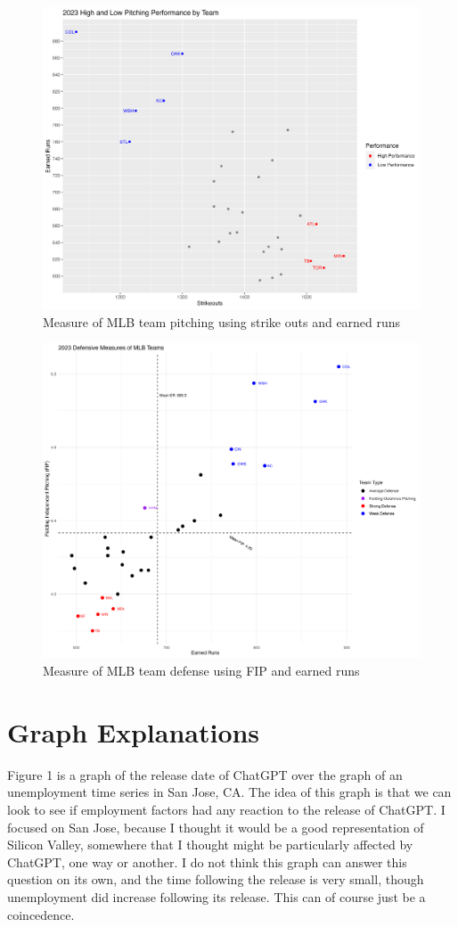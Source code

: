 \documentclass{article}
\begin{document}
\begin{figure}
    \centering
    \includegraphics[width=0.8\linewidth]{PS6b_Spohn.png}
    \caption{Measure of MLB team pitching using strike outs and earned runs}
\end{figure}

\begin{figure}
    \centering
    \includegraphics[width=0.8\linewidth]{PS6c_Spohn.png}
    \caption{Measure of MLB team defense using FIP and earned runs}
\end{figure}

\section{Graph Explanations}
Figure 1 is a graph of the release date of ChatGPT over the graph of an unemployment time series in San Jose, CA. The idea of this graph is that we can look to see if employment factors had any reaction to the release of ChatGPT. I focused on San Jose, because I thought it would be a good representation of Silicon Valley, somewhere that I thought might be particularly affected by ChatGPT, one way or another. I do not think this graph can answer this question on its own, and the time following the release is very small, though unemployment did increase following its release. This can of course just be a coincedence.
\end{document}

